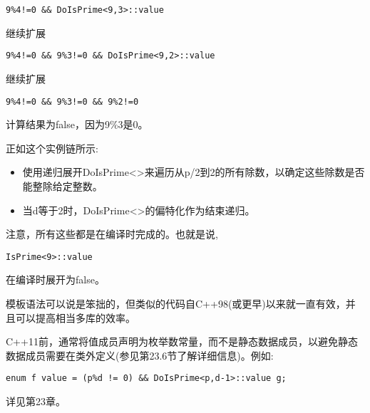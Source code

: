 \begin{lstlisting}[style=styleCXX]
9%4!=0 && DoIsPrime<9,3>::value
\end{lstlisting}

继续扩展

\begin{lstlisting}[style=styleCXX]
9%4!=0 && 9%3!=0 && DoIsPrime<9,2>::value
\end{lstlisting}

继续扩展

\begin{lstlisting}[style=styleCXX]
9%4!=0 && 9%3!=0 && 9%2!=0
\end{lstlisting}

计算结果为false，因为9\%3是0。

正如这个实例链所示:

\begin{itemize}
\item 
使用递归展开DoIsPrime<>来遍历从p/2到2的所有除数，以确定这些除数是否能整除给定整数。

\item 
当d等于2时，DoIsPrime<>的偏特化作为结束递归。
\end{itemize}

注意，所有这些都是在编译时完成的。也就是说,

\begin{lstlisting}[style=styleCXX]
IsPrime<9>::value
\end{lstlisting}

在编译时展开为false。

模板语法可以说是笨拙的，但类似的代码自C++98(或更早)以来就一直有效，并且可以提高相当多库的效率。

\begin{tcolorbox}[colback=webgreen!5!white,colframe=webgreen!75!black]
\hspace*{0.75cm}C++11前，通常将值成员声明为枚举数常量，而不是静态数据成员，以避免静态数据成员需要在类外定义(参见第23.6节了解详细信息)。例如:
\begin{lstlisting}[style=styleCXX]
enum f value = (p%d != 0) && DoIsPrime<p,d-1>::value g;
\end{lstlisting}
\end{tcolorbox}

详见第23章。


























